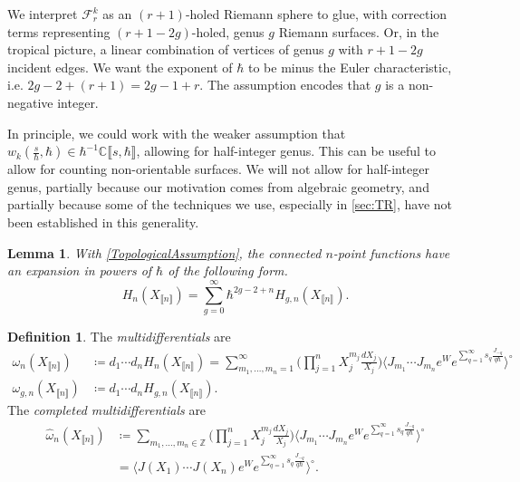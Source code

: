 \documentclass[10pt,a4paper,oneside,no-math,reqno]{amsart}%
\theoremstyle{plain}
\newtheorem{lemma}[theorem]{Lemma}
\theoremstyle{definition}
\newtheorem{definition}[theorem]{Definition}
\theoremstyle{remark}
\numberwithin{equation}{section}
\newcommand{\mb}[1]{\mathbb{#1}}
\newcommand{\mc}[1]{\mathcal{#1}}
\newcommand{\1}{\mathds{1}}
\newcommand{\C}{\mb{C}}
\newcommand{\Z}{\mb{Z}}
\newcommand{\<}{\langle}
\renewcommand{\>}{\rangle}
\begin{document}
We interpret $ \mc{F}_r^k$ as an $(r+1)$-holed Riemann sphere to glue, with correction terms representing $ (r+1-2g)$-holed, genus $g$ Riemann surfaces.
Or, in the tropical picture, a linear combination of vertices of genus $g$ with $ r+1-2g$ incident edges. We want the exponent of $ \hbar$ to be minus the Euler characteristic, i.e. $ 2g -2 + (r+1) = 2g-1+r$. The assumption encodes that $ g$ is a non-negative integer.\par
In principle, we could work with the weaker assumption that $ w_k (\frac{s}{\hbar}, \hbar ) \in \hbar^{-1} \C \llbracket s, \hbar \rrbracket$, allowing for half-integer genus. This can be useful to allow for counting non-orientable surfaces. We will not allow for half-integer genus, partially because our motivation comes from algebraic geometry, and partially because some of the techniques we use, especially in \cref{sec:TR}, have not been established in this generality.

\begin{lemma}
    With \cref{TopologicalAssumption}, the connected $n$-point functions have an expansion in powers of $ \hbar$ of the following form.
    \begin{equation}
        H_n (X_{\llbracket n \rrbracket})
        =
        \sum_{g = 0}^\infty \hbar^{2g-2+n} H_{g,n} ( X_{\llbracket n \rrbracket} ).
    \end{equation}
\end{lemma}


\begin{definition}\label{def:Multidifferentials}
    The \emph{multidifferentials} are
    \begin{align}
        \omega_{n} (X_{\llbracket n \rrbracket} )
        &\coloneqq
        d_1 \dotsb d_n H_{n} (X_{\llbracket n \rrbracket})
        =
        \sum_{m_1, \dotsc, m_n = 1}^\infty \Big( \prod_{j=1}^n X_j^{m_j} \frac{dX_j}{X_j} \Big) \Big\< J_{m_1} \dotsb J_{m_n} e^W e^{\sum_{q=1}^\infty s_q \frac{J_{-q}}{q\hbar}} \Big\>^\circ
        \\
        \omega_{g,n} (X_{\llbracket n \rrbracket} )
        &\coloneqq
        d_1 \dotsb d_n H_{g,n} (X_{\llbracket n \rrbracket}).
    \end{align}
    The \emph{completed multidifferentials} are
    \begin{equation}\label{Correlators}
        \begin{split}
            \widehat{\omega}_{n} (X_{\llbracket n \rrbracket} )
            &\coloneqq
            \sum_{m_1, \dotsc, m_n \in \Z} \Big( \prod_{j=1}^n X_j^{m_j} \frac{dX_j}{X_j} \Big) \Big\< J_{m_1} \dotsb J_{m_n} e^W e^{\sum_{q=1}^\infty s_q \frac{J_{-q}}{q\hbar}} \Big\>^\circ
            \\
            &=
            \Big\< J(X_1) \dotsb J(X_n) e^W e^{\sum_{q=1}^\infty s_q \frac{J_{-q}}{q\hbar}} \Big\>^\circ.
        \end{split}
    \end{equation}
\end{definition}
\end{document}
